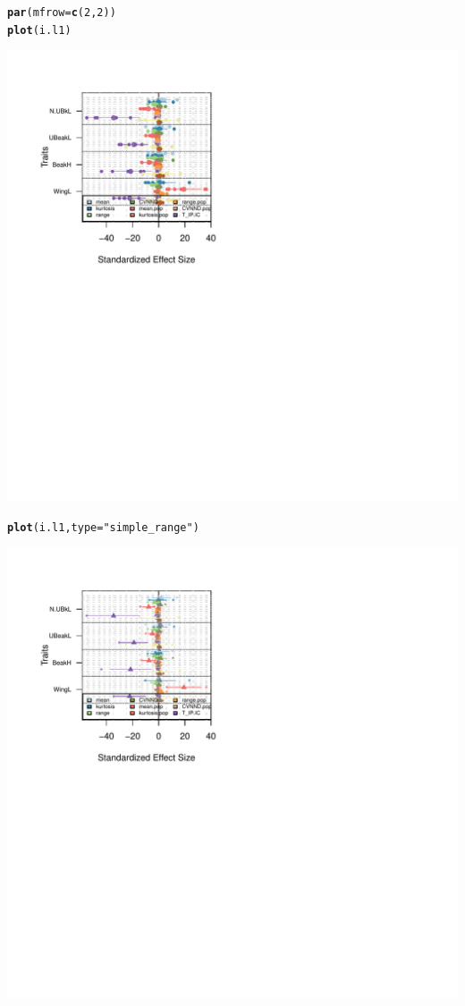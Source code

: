 \documentclass[12pt]{article}\usepackage[]{graphicx}\usepackage[]{color}
\makeatletter
\def\maxwidth{ %
  \ifdim\Gin@nat@width>\linewidth
    \linewidth
  \else
    \Gin@nat@width
  \fi
}
\newcommand{\hlnum}[1]{\textcolor[rgb]{0.686,0.059,0.569}{#1}}%
\newcommand{\hlstr}[1]{\textcolor[rgb]{0.192,0.494,0.8}{#1}}%
\newcommand{\hlstd}[1]{\textcolor[rgb]{0.345,0.345,0.345}{#1}}%
\newcommand{\hlkwc}[1]{\textcolor[rgb]{0.333,0.667,0.333}{#1}}%
\newcommand{\hlkwd}[1]{\textcolor[rgb]{0.737,0.353,0.396}{\textbf{#1}}}%
\newenvironment{kframe}{%
 \def\at@end@of@kframe{}%
 \ifinner\ifhmode%
  \def\at@end@of@kframe{\end{minipage}}%
  \begin{minipage}{\columnwidth}%
 \fi\fi%
 \def\FrameCommand##1{\hskip\@totalleftmargin \hskip-\fboxsep
 \colorbox{shadecolor}{##1}\hskip-\fboxsep
     \hskip-\linewidth \hskip-\@totalleftmargin \hskip\columnwidth}%
 \MakeFramed {\advance\hsize-\width
   \@totalleftmargin\z@ \linewidth\hsize
   \@setminipage}}%
 {\par\unskip\endMakeFramed%
 \at@end@of@kframe}
\newenvironment{knitrout}{}{} %
\makeatother
\begin{document}
\begin{knitrout}
\color{fgcolor}\begin{kframe}
\begin{alltt}
\hlkwd{par}\hlstd{(}\hlkwc{mfrow}\hlstd{=}\hlkwd{c}\hlstd{(}\hlnum{2}\hlstd{,}\hlnum{2}\hlstd{))}
\hlkwd{plot}\hlstd{(i.l1)}
\end{alltt}
\end{kframe}
\includegraphics[width=\maxwidth]{figure/unnamed-chunk-431} 
\begin{kframe}\begin{alltt}
\hlkwd{plot}\hlstd{(i.l1,}\hlkwc{type}\hlstd{=}\hlstr{"simple_range"}\hlstd{)}
\end{alltt}
\end{kframe}
\includegraphics[width=\maxwidth]{figure/unnamed-chunk-432} 

\end{knitrout}
\end{document}
